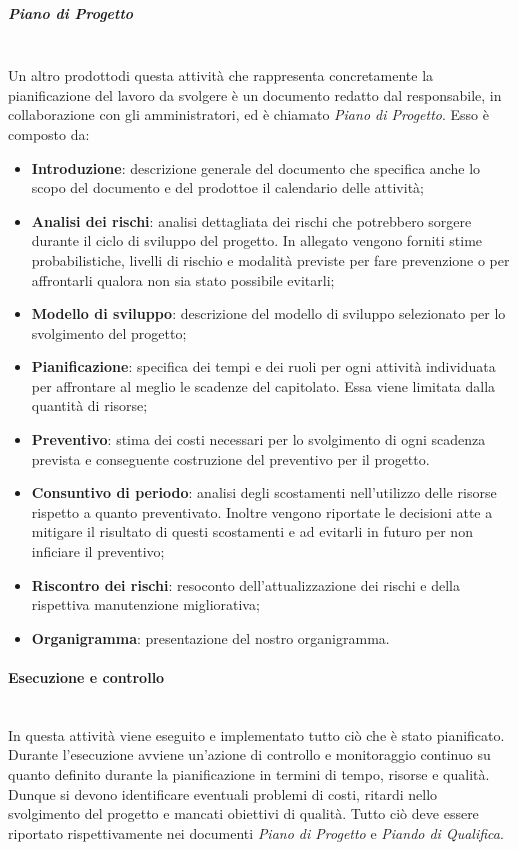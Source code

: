 				\subparagraph*{Piano di Progetto}\mbox{}\\ [1mm]
				Un altro prodotto\glosp di questa attività che rappresenta concretamente la pianificazione del lavoro da svolgere è un documento redatto dal responsabile, in collaborazione con gli amministratori, ed è chiamato \textit{Piano di Progetto}. Esso è composto da:
				\begin{itemize}
					\item \textbf{Introduzione}: descrizione generale del documento che specifica anche lo scopo del documento e del prodotto\glosp e il calendario delle attività;
					\item \textbf{Analisi dei rischi}: analisi dettagliata dei rischi che potrebbero sorgere durante il ciclo di sviluppo del progetto\glo. In allegato vengono forniti stime probabilistiche, livelli di rischio e modalità previste per fare prevenzione o per affrontarli qualora non sia stato possibile evitarli;
					\item \textbf{Modello di sviluppo}: descrizione del modello di sviluppo selezionato per lo svolgimento del progetto\glo;
					\item \textbf{Pianificazione}: specifica dei tempi e dei ruoli per ogni attività individuata per affrontare al meglio le scadenze del capitolato\glo. Essa viene limitata dalla quantità di risorse;
					\item \textbf{Preventivo}: stima dei costi necessari per lo svolgimento di ogni scadenza prevista e conseguente costruzione del preventivo per il progetto\glo.
					\item \textbf{Consuntivo di periodo}: analisi degli scostamenti nell'utilizzo delle risorse rispetto a quanto preventivato. Inoltre vengono riportate le decisioni atte a mitigare il risultato di questi scostamenti e ad evitarli in futuro per non inficiare il preventivo;
					\item \textbf{Riscontro dei rischi}: resoconto dell'attualizzazione dei rischi e della rispettiva manutenzione migliorativa;
					\item \textbf{Organigramma}: presentazione del nostro organigramma.
				\end{itemize}			
			\paragraph{Esecuzione e controllo}\mbox{}\\ [1mm]
				In questa attività viene eseguito e implementato tutto ciò che è stato pianificato.
				Durante l'esecuzione avviene un'azione di controllo e monitoraggio continuo su quanto definito durante la pianificazione in termini di tempo, risorse e qualità. Dunque si devono identificare eventuali problemi di costi, ritardi nello svolgimento del progetto e mancati obiettivi di qualità. Tutto ciò deve essere riportato rispettivamente nei documenti \textit{Piano di Progetto} e \textit{Piando di Qualifica}.
